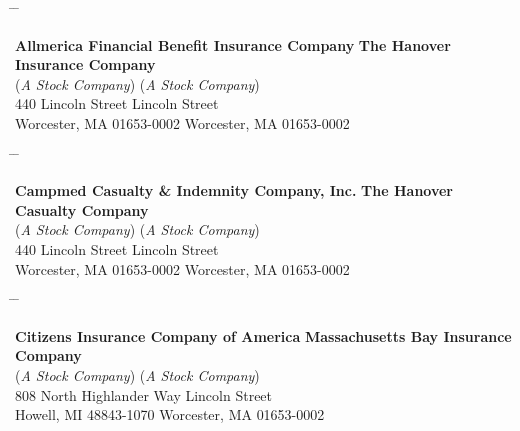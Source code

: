 \documentclass[10pt]{article}
\begin{document}
\begin{tabbing}

    \hspace{1in} \= \hspace{3in} \= \kill

    \textbf{Allmerica Financial Benefit Insurance Company} \> \> \textbf{The Hanover Insurance Company} \\

    (\textit{A Stock Company}) \> \> (\textit{A Stock Company}) \\

    440 Lincoln Street \>  Lincoln Street \\

    Worcester, MA 01653-0002 \> \> Worcester, MA 01653-0002 \\

\end{tabbing}

\begin{tabbing}

    \hspace{1in} \= \hspace{3in} \= \kill

    \textbf{Campmed Casualty \& Indemnity Company, Inc.} \> \> \textbf{The Hanover Casualty Company} \\

    (\textit{A Stock Company}) \> \> (\textit{A Stock Company}) \\

    440 Lincoln Street \>  Lincoln Street \\

    Worcester, MA 01653-0002 \> \> Worcester, MA 01653-0002 \\

\end{tabbing}

\begin{tabbing}

    \hspace{1in} \= \hspace{3in} \= \kill

    \textbf{Citizens Insurance Company of America} \> \> \textbf{Massachusetts Bay Insurance Company} \\

    (\textit{A Stock Company}) \> \> (\textit{A Stock Company}) \\

    808 North Highlander Way \>  Lincoln Street \\

    Howell, MI 48843-1070 \> \> Worcester, MA 01653-0002 \\

\end{tabbing}
\end{document}
